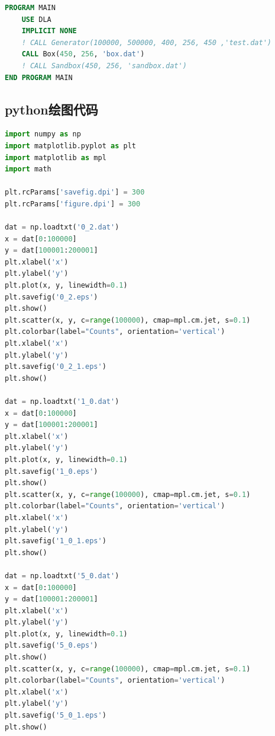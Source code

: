 \documentclass[12pt,a4paper,utf8]{ctexart}
\begin{document}
\begin{framed}
\begin{lstlisting}[language=Fortran]
PROGRAM MAIN
    USE DLA
    IMPLICIT NONE
    ! CALL Generator(100000, 500000, 400, 256, 450 ,'test.dat')
    CALL Box(450, 256, 'box.dat')
    ! CALL Sandbox(450, 256, 'sandbox.dat')
END PROGRAM MAIN
\end{lstlisting}
\end{framed}

\subsection{python绘图代码}
\begin{framed}
\begin{lstlisting}[language=python]
import numpy as np
import matplotlib.pyplot as plt
import matplotlib as mpl
import math

plt.rcParams['savefig.dpi'] = 300
plt.rcParams['figure.dpi'] = 300

dat = np.loadtxt('0_2.dat')
x = dat[0:100000]
y = dat[100001:200001]
plt.xlabel('x')
plt.ylabel('y')
plt.plot(x, y, linewidth=0.1)
plt.savefig('0_2.eps')
plt.show()
plt.scatter(x, y, c=range(100000), cmap=mpl.cm.jet, s=0.1)
plt.colorbar(label="Counts", orientation='vertical')
plt.xlabel('x')
plt.ylabel('y')
plt.savefig('0_2_1.eps')
plt.show()

dat = np.loadtxt('1_0.dat')
x = dat[0:100000]
y = dat[100001:200001]
plt.xlabel('x')
plt.ylabel('y')
plt.plot(x, y, linewidth=0.1)
plt.savefig('1_0.eps')
plt.show()
plt.scatter(x, y, c=range(100000), cmap=mpl.cm.jet, s=0.1)
plt.colorbar(label="Counts", orientation='vertical')
plt.xlabel('x')
plt.ylabel('y')
plt.savefig('1_0_1.eps')
plt.show()

dat = np.loadtxt('5_0.dat')
x = dat[0:100000]
y = dat[100001:200001]
plt.xlabel('x')
plt.ylabel('y')
plt.plot(x, y, linewidth=0.1)
plt.savefig('5_0.eps')
plt.show()
plt.scatter(x, y, c=range(100000), cmap=mpl.cm.jet, s=0.1)
plt.colorbar(label="Counts", orientation='vertical')
plt.xlabel('x')
plt.ylabel('y')
plt.savefig('5_0_1.eps')
plt.show()

\end{lstlisting}
\end{framed}
\end{document}
